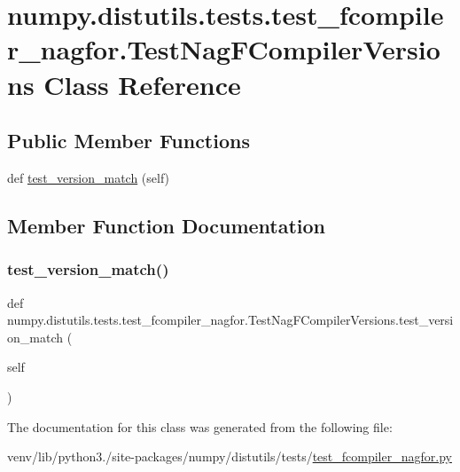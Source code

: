 \hypertarget{classnumpy_1_1distutils_1_1tests_1_1test__fcompiler__nagfor_1_1TestNagFCompilerVersions}{}\section{numpy.\+distutils.\+tests.\+test\+\_\+fcompiler\+\_\+nagfor.\+Test\+Nag\+F\+Compiler\+Versions Class Reference}
\label{classnumpy_1_1distutils_1_1tests_1_1test__fcompiler__nagfor_1_1TestNagFCompilerVersions}
\subsection*{Public Member Functions}
\begin{DoxyCompactItemize}
\item 
def \hyperlink{classnumpy_1_1distutils_1_1tests_1_1test__fcompiler__nagfor_1_1TestNagFCompilerVersions_a671fa6203536d485724eb42a1040a9bc}{test\+\_\+version\+\_\+match} (self)
\end{DoxyCompactItemize}


\subsection{Member Function Documentation}
\mbox{\label{classnumpy_1_1distutils_1_1tests_1_1test__fcompiler__nagfor_1_1TestNagFCompilerVersions_a671fa6203536d485724eb42a1040a9bc}} 
\subsubsection{\texorpdfstring{test\+\_\+version\+\_\+match()}{test\_version\_match()}}
{\footnotesize\ttfamily def numpy.\+distutils.\+tests.\+test\+\_\+fcompiler\+\_\+nagfor.\+Test\+Nag\+F\+Compiler\+Versions.\+test\+\_\+version\+\_\+match (\begin{DoxyParamCaption}\item[{}]{self }\end{DoxyParamCaption})}



The documentation for this class was generated from the following file\+:\begin{DoxyCompactItemize}
\item 
venv/lib/python3./site-\/packages/numpy/distutils/tests/\hyperlink{test__fcompiler__nagfor_8py}{test\+\_\+fcompiler\+\_\+nagfor.\+py}\end{DoxyCompactItemize}
